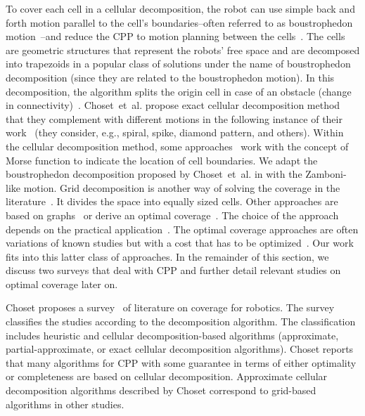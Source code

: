 To cover each cell in a cellular decomposition, the robot can use simple back and forth motion parallel to the cell's boundaries--often referred to as boustrophedon motion~\citep{lavalle2006planning}--and reduce the CPP to motion planning between the cells~\citep{choset2001coverage}. The cells are geometric structures that represent the robots' free space and are decomposed into trapezoids in a popular class of solutions under the name of boustrophedon decomposition (since they are related to the boustrophedon motion). In this decomposition, the algorithm splits the origin cell in case of an obstacle (change in connectivity)~\citep{choset2000exact}. Choset~et~al. propose exact cellular decomposition method~\citep{choset1998coverage} that they complement with different motions in the following instance of their work~\citep{choset2000exact} (they consider, e.g., spiral, spike, diamond pattern, and others). Within the cellular decomposition method, some approaches~\citep{choset2000exact,acar2002morse} work with the concept of Morse function to indicate the location of cell boundaries. We adapt the boustrophedon decomposition proposed by Choset~et~al. in  with the Zamboni-like motion. Grid decomposition is another way of solving the coverage in the literature~\citep{zelinsky1993planning,gabriely2002spiral,shnaps2016online,wei2018coverage}. It divides the space into equally sized cells. Other approaches are based on graphs~\citep{cheng2019graph} or derive an optimal coverage~\citep{huang2001optimal,xu2011optimal,lee2011smooth,li2011coverage,wei2018coverage}. The choice of the approach depends on the practical application~\citep{wei2018coverage}. The optimal coverage approaches are often variations of known studies but with a cost that has to be optimized~\citep{galceran2013survey}. Our work fits into this latter class of approaches. In the remainder of this section, we discuss two surveys that deal with CPP and further detail relevant studies on optimal coverage later on. 

Choset proposes a survey~\citep{choset2001coverage} of literature on coverage for robotics. The survey classifies the studies according to the decomposition algorithm. The classification includes heuristic and cellular decomposition-based algorithms (approximate, partial-approximate, or exact cellular decomposition algorithms). Choset reports that many algorithms for CPP with some guarantee in terms of either optimality or completeness are based on cellular decomposition. Approximate cellular decomposition algorithms described by Choset correspond to grid-based algorithms in other studies.

